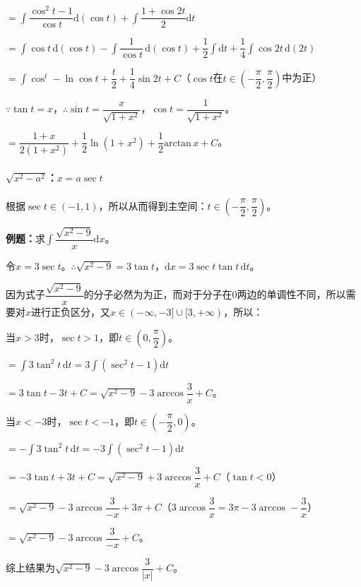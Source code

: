 \documentclass[UTF8, 12pt]{ctexart}
\begin{document}
$=\displaystyle{\int\dfrac{\cos^2t-1}{\cos t}\textrm{d}(\cos t)+\int\dfrac{1+\cos2t}{2}\textrm{d}t}$

$=\displaystyle{\int\cos t\,\textrm{d}(\cos t)-\int\dfrac{1}{\cos t}\,\textrm{d}(\cos t)+\dfrac{1}{2}\int\textrm{d}t+\dfrac{1}{4}\int\cos2t\,\textrm{d}(2t)}$

$=\displaystyle{\int\cos^t-\ln\cos t+\dfrac{t}{2}+\dfrac{1}{4}\sin2t+C}$（$\cos t$在$t\in\left(-\dfrac{\pi}{2},\dfrac{\pi}{2}\right)$中为正）

$\because\tan t=x$，$\therefore\sin t=\dfrac{x}{\sqrt{1+x^2}}$，$\cos t=\dfrac{1}{\sqrt{1+x^2}}$。

$=\dfrac{1+x}{2(1+x^2)}+\dfrac{1}{2}\ln(1+x^2)+\dfrac{1}{2}\textrm{arctan}\,x+C$。

\paragraph{\texorpdfstring{$\sqrt{x^2-a^2}$：$x=a\sec t$}\ } \leavevmode \medskip

根据$\sec t\in(-1,1)$，所以从而得到主空间：$t\in\left(-\dfrac{\pi}{2},\dfrac{\pi}{2}\right)$。\medskip

\textbf{例题：}求$\displaystyle{\int\dfrac{\sqrt{x^2-9}}{x}\textrm{d}x}$。

令$x=3\sec t$。$\therefore\sqrt{x^2-9}=3\tan t$，$\textrm{d}x=3\sec t\tan t\,\textrm{d}t$。\medskip

因为式子$\dfrac{\sqrt{x^2-9}}{x}$的分子必然为为正，而对于分子在0两边的单调性不同，所以需要对$x$进行正负区分，又$x\in(-\infty,-3]\cup[3,+\infty)$，所以：

当$x>3$时，$\sec t>1$，即$t\in\left(0,\dfrac{\pi}{2}\right)$。

$=\displaystyle{\int3\tan^2t\,\textrm{d}t=3\int(\sec^2t-1)\textrm{d}t}$

$=3\tan t-3t+C=\sqrt{x^2-9}-3\arccos\dfrac{3}{x}+C$。

当$x<-3$时，$\sec t<-1$，即$t\in\left(-\dfrac{\pi}{2},0\right)$。

$=\displaystyle{-\int3\tan^2t\,\textrm{d}t=-3\int(\sec^2t-1)\textrm{d}t}$

$=-3\tan t+3t+C=\sqrt{x^2-9}+3\arccos\dfrac{3}{x}+C$（$\tan t<0$）

$=\sqrt{x^2-9}-3\arccos\dfrac{3}{-x}+3\pi+C$（$3\arccos\dfrac{3}{x}=3\pi-3\arccos-\dfrac{3}{x}$）

$=\sqrt{x^2-9}-3\arccos\dfrac{3}{-x}+C$。

综上结果为$\sqrt{x^2-9}-3\arccos\dfrac{3}{\vert x\vert}+C$。
\end{document}
